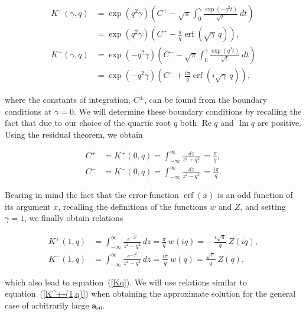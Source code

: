\documentclass[draft]{agujournal2019}
\renewcommand{\vec}{\mathbf}
\begin{document}
\begin{linenomath*}
\begin{align*}
K^{+}(\gamma,q)  & =\exp\left(  q^{2}\gamma\right)  \left(  C^{+}-\sqrt{\pi
}\int_{0}^{\gamma}\frac{\exp\left(  -q^{2}t\right)  }{\sqrt{t}}\ dt\right)
\\
& =\exp\left(  q^{2}\gamma\right)  \left(  C^{+}-\frac{\pi}{q}%
\operatorname{erf}\left(  \sqrt{\gamma}\,q\right)  \right)  ,\\
K^{-}(\gamma,q)  & =\exp\left(  -q^{2}\gamma\right)  \left(  C^{-}-\sqrt{\pi
}\int_{0}^{\gamma}\frac{\exp\left(  q^{2}t\right)  }{\sqrt{t}}\ dt\right)  \\
& =\exp\left(  -q^{2}\gamma\right)  \left(  C^{-}+\frac{i\pi}%
{q}\operatorname{erf}\left(  i\sqrt{\gamma}\,q\right)  \right)  ,
\end{align*}
\end{linenomath*}
where the constants of integration, $C^{\pm}$, can be found from the boundary conditions
at $\gamma=0$. %
We will determine these boundary conditions by recalling the fact that
due to our choice of the quartic root $q$ both $\operatorname{Re}q$ and
$\operatorname{Im}q$ are positive. Using the residual theorem, we
obtain
\begin{linenomath*}
\begin{align*}
C^{+}  & =K^{+}(0,q)=\int_{-\infty}^{\infty}\frac{dz}{z^{2}+q^{2}}\,=\frac
{\pi}{q},\\
C^{-}  & =K^{-}(0,q)=\int_{-\infty}^{\infty}\frac{dz}{z^{2}-q^{2}}
\,=\frac{i\pi}{q}.
\end{align*}
\end{linenomath*}
Bearing in mind the fact that the error-function $\operatorname{erf}(x)$ is an odd function of its argument $x$, recalling the definitions of
the functions $w$ and $Z$, and setting $\gamma=1$, we finally obtain relations
\begin{linenomath*}
\begin{subequations}
\label{K^+-(1,q)}
\begin{align}
K^{+}(1,q) &  =\int_{-\infty}^{\infty}\frac{e^{-z^{2}}}{z^{2}+q^{2}}
\,dz=\frac{\pi}{q}\ w(iq)=-\,\frac{i\sqrt{\pi}}{q}\ Z(iq),\label{K^+(1,q)}\\
K^{-}(1,q) &  =\int_{-\infty}^{\infty}\frac{e^{-z^{2}}}{z^{2}-q^{2}}
\,dz=\frac{i\pi}{q}\ w(q)=\frac{\sqrt{\pi}}{q}\ Z(q),
\label{K^-(1,q)}
\end{align}
\end{subequations}
\end{linenomath*}
which also lead to equation~(\ref{Kq}). We will use relations similar to equation~(\ref{K^+-(1,q)})
when obtaining the approximate solution for the general case of arbitrarily large $\vec{a}_{e0}$. 
\end{document}

